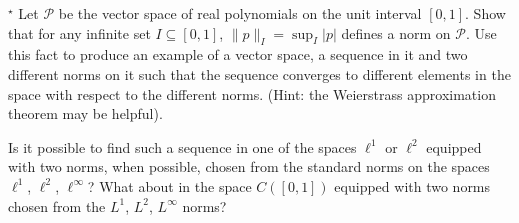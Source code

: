 $^\star$ Let $\mathcal P$ be the vector space of real polynomials on the unit interval $[0,1]$. Show that for any infinite set $I\subseteq[0,1]$, $\|p\|_I=\sup_I|p|$ defines a norm on $\mathcal P$. Use this fact to produce an example of a vector space, a sequence in it and two different norms on it such that the sequence converges to different elements in the space with respect to the different norms. (Hint: the Weierstrass approximation theorem may be helpful).

Is it possible to find such a sequence in one of the spaces $\ell^1$ or $\ell^2$ equipped with two norms, when possible, chosen from the standard norms on the spaces $\ell^1$, $\ell^2$, $\ell^\infty$? What about in the space $C([0,1])$ equipped with two norms chosen from the $L^1$, $L^2$, $L^\infty$ norms?
